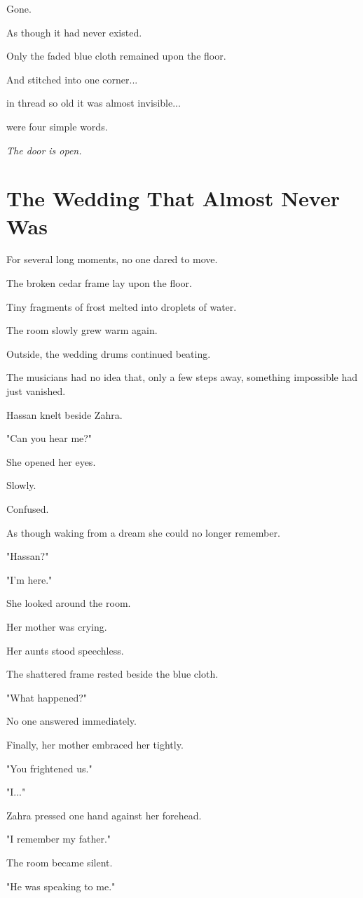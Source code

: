\documentclass[12pt,openany]{book}
\begin{document}
Gone.

As though it had never existed.

Only the faded blue cloth remained upon the floor.

And stitched into one corner...

in thread so old it was almost invisible...

were four simple words.

\emph{The door is open.}
\section*{The Wedding That Almost Never Was}

For several long moments, no one dared to move.

The broken cedar frame lay upon the floor.

Tiny fragments of frost melted into droplets of water.

The room slowly grew warm again.

Outside, the wedding drums continued beating.

The musicians had no idea that, only a few steps away, something impossible had just vanished.

Hassan knelt beside Zahra.

"Can you hear me?"

She opened her eyes.

Slowly.

Confused.

As though waking from a dream she could no longer remember.

"Hassan?"

"I'm here."

She looked around the room.

Her mother was crying.

Her aunts stood speechless.

The shattered frame rested beside the blue cloth.

"What happened?"

No one answered immediately.

Finally, her mother embraced her tightly.

"You frightened us."

"I..."

Zahra pressed one hand against her forehead.

"I remember my father."

The room became silent.

"He was speaking to me."
\end{document}
